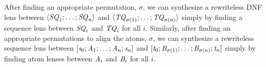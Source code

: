 \documentclass[numbers,10pt,preprint\ifanon ,nocopyrightspace\fi]{sigplanconf}
\begin{document}
After finding an appropriate permutation, $\sigma$, we can
synthesize a rewriteless DNF lens between
$\langle\mathit{SQ}_1;\ldots;\mathit{SQ}_n\rangle$ and
$\langle\mathit{TQ}_{\sigma(1)};\ldots;\mathit{TQ}_{\sigma(n)}\rangle$ simply by finding a
sequence lens between $\mathit{SQ}_i$ and $\mathit{TQ}_i$ for all $i$.
Similarly, after finding an appropriate permutations to align the atoms,
$\sigma$,
we can synthesize a rewriteless sequence lens between
$[\mathit{s}_0;\mathit{A}_1;\ldots;\mathit{A}_n;\mathit{s}_n]$ and
$[\mathit{t}_0;\mathit{B}_{\sigma(1)};\ldots;\mathit{B}_{\sigma(n)};\mathit{t}_n]$
simply by finding atom lenses between $\mathit{A}_i$ and $\mathit{B}_i$ for
all $i$.






%
\end{document}
